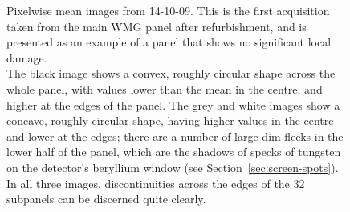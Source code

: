 \documentclass[\main/IO-Pixels.tex]{subfiles}
\begin{document}
\begin{figure}
\caption{ Pixelwise mean images from 14-10-09. This is the first acquisition taken from the main WMG panel after refurbishment, and is presented as an example of a panel that shows no significant local damage.\\
\footnotesize{The black image shows a convex, roughly circular shape across the whole panel, with values lower than the mean in the centre, and higher at the edges of the panel. The grey and white images show a concave, roughly circular shape, having higher values in the centre and lower at the edges; there are a number of large dim flecks in the lower half of the panel, which are the shadows of specks of tungsten on the detector's beryllium window (see Section~\ref{sec:screen-spots}). In all three images, discontinuities across the edges of the 32 subpanels can be discerned quite clearly.}}
\label{fig:pwm-images}
    
\end{figure}
\end{document}
